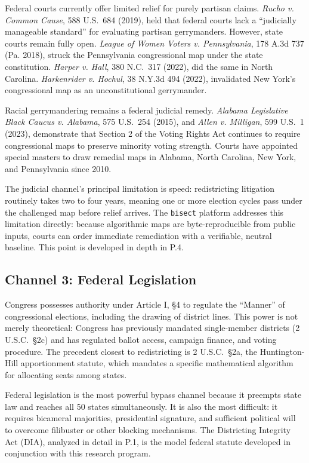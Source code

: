 Federal courts currently offer limited relief for purely partisan claims. \textit{Rucho v. Common Cause}, 588 U.S.\ 684 (2019), held that federal courts lack a ``judicially manageable standard'' for evaluating partisan gerrymanders. However, state courts remain fully open. \textit{League of Women Voters v. Pennsylvania}, 178 A.3d 737 (Pa. 2018), struck the Pennsylvania congressional map under the state constitution. \textit{Harper v. Hall}, 380 N.C.\ 317 (2022), did the same in North Carolina. \textit{Harkenrider v. Hochul}, 38 N.Y.3d 494 (2022), invalidated New York's congressional map as an unconstitutional gerrymander.

Racial gerrymandering remains a federal judicial remedy. \textit{Alabama Legislative Black Caucus v. Alabama}, 575 U.S.\ 254 (2015), and \textit{Allen v. Milligan}, 599 U.S.\ 1 (2023), demonstrate that Section 2 of the Voting Rights Act continues to require congressional maps to preserve minority voting strength. Courts have appointed special masters to draw remedial maps in Alabama, North Carolina, New York, and Pennsylvania since 2010.

The judicial channel's principal limitation is speed: redistricting litigation routinely takes two to four years, meaning one or more election cycles pass under the challenged map before relief arrives. The \texttt{bisect} platform addresses this limitation directly: because algorithmic maps are byte-reproducible from public inputs, courts can order immediate remediation with a verifiable, neutral baseline. This point is developed in depth in P.4.

\subsection{Channel 3: Federal Legislation}

Congress possesses authority under Article I, \S4 to regulate the ``Manner'' of congressional elections, including the drawing of district lines. This power is not merely theoretical: Congress has previously mandated single-member districts (2 U.S.C.\ \S2c) and has regulated ballot access, campaign finance, and voting procedure. The precedent closest to redistricting is 2 U.S.C.\ \S2a, the Huntington-Hill apportionment statute, which mandates a specific mathematical algorithm for allocating seats among states.

Federal legislation is the most powerful bypass channel because it preempts state law and reaches all 50 states simultaneously. It is also the most difficult: it requires bicameral majorities, presidential signature, and sufficient political will to overcome filibuster or other blocking mechanisms. The Districting Integrity Act (DIA), analyzed in detail in P.1, is the model federal statute developed in conjunction with this research program.

